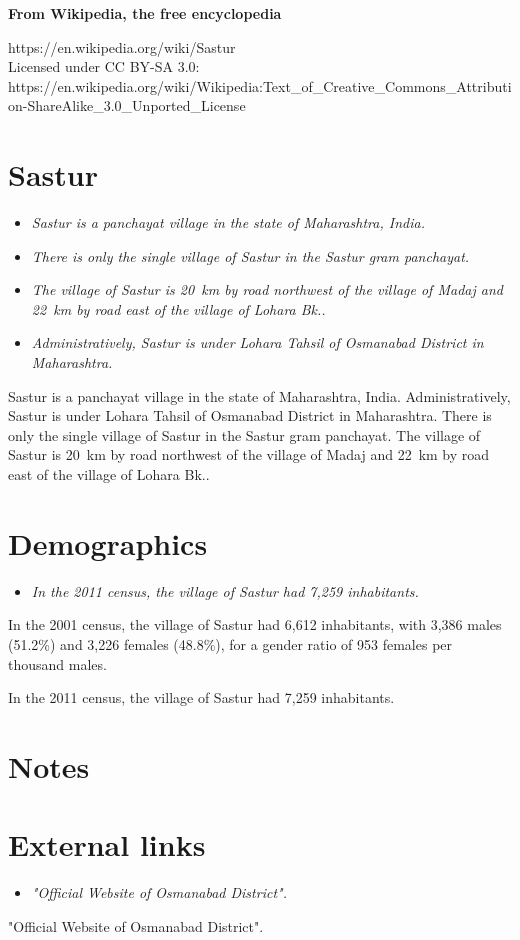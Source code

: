 \textbf{From Wikipedia, the free encyclopedia}

https://en.wikipedia.org/wiki/Sastur\\
Licensed under CC BY-SA 3.0:\\
https://en.wikipedia.org/wiki/Wikipedia:Text\_of\_Creative\_Commons\_Attribution-ShareAlike\_3.0\_Unported\_License

\section{Sastur}\label{sastur}

\begin{itemize}
\item
  \emph{Sastur is a panchayat village in the state of Maharashtra,
  India.}
\item
  \emph{There is only the single village of Sastur in the Sastur gram
  panchayat.}
\item
  \emph{The village of Sastur is 20~km by road northwest of the village
  of Madaj and 22~km by road east of the village of Lohara Bk..}
\item
  \emph{Administratively, Sastur is under Lohara Tahsil of Osmanabad
  District in Maharashtra.}
\end{itemize}

Sastur is a panchayat village in the state of Maharashtra, India.
Administratively, Sastur is under Lohara Tahsil of Osmanabad District in
Maharashtra. There is only the single village of Sastur in the Sastur
gram panchayat. The village of Sastur is 20~km by road northwest of the
village of Madaj and 22~km by road east of the village of Lohara Bk..

\section{Demographics}\label{demographics}

\begin{itemize}
\item
  \emph{In the 2011 census, the village of Sastur had 7,259
  inhabitants.}
\end{itemize}

In the 2001 census, the village of Sastur had 6,612 inhabitants, with
3,386 males (51.2\%) and 3,226 females (48.8\%), for a gender ratio of
953 females per thousand males.

In the 2011 census, the village of Sastur had 7,259 inhabitants.

\section{Notes}\label{notes}

\section{External links}\label{external-links}

\begin{itemize}
\item
  \emph{"Official Website of Osmanabad District".}
\end{itemize}

"Official Website of Osmanabad District".
